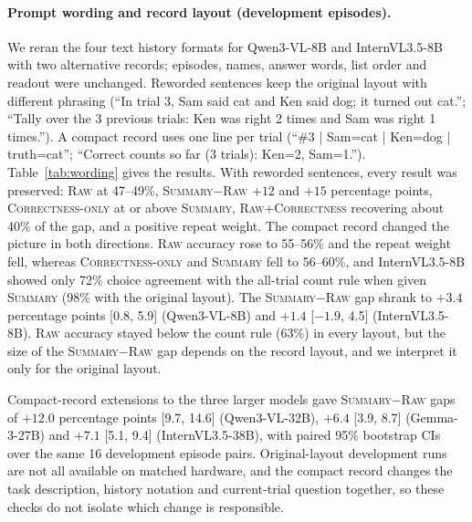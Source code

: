 \documentclass[letterpaper]{article} %
\newcommand{\Raw}{\textsc{Raw}}
\newcommand{\RawCorrectness}{\textsc{Raw+Correctness}}
\newcommand{\CorrectnessOnly}{\textsc{Correctness-only}}
\newcommand{\Summary}{\textsc{Summary}}
\begin{document}
\paragraph{Prompt wording and record layout (development episodes).} We reran the four text history formats for Qwen3-VL-8B and InternVL3.5-8B with two alternative records; episodes, names, answer words, list order and readout were unchanged. Reworded sentences keep the original layout with different phrasing (``In trial 3, Sam said cat and Ken said dog; it turned out cat.''; ``Tally over the 3 previous trials: Ken was right 2 times and Sam was right 1 times.''). A compact record uses one line per trial (``\#3 | Sam=cat | Ken=dog | truth=cat''; ``Correct counts so far (3 trials): Ken=2, Sam=1.''). Table~\ref{tab:wording} gives the results. With reworded sentences, every result was preserved: \Raw{} at 47--49\%, \Summary{}$-$\Raw{} $+12$ and $+15$ percentage points, \CorrectnessOnly{} at or above \Summary{}, \RawCorrectness{} recovering about 40\% of the gap, and a positive repeat weight. The compact record changed the picture in both directions. \Raw{} accuracy rose to 55--56\% and the repeat weight fell, whereas \CorrectnessOnly{} and \Summary{} fell to 56--60\%, and InternVL3.5-8B showed only 72\% choice agreement with the all-trial count rule when given \Summary{} (98\% with the original layout). The \Summary{}$-$\Raw{} gap shrank to $+3.4$ percentage points [0.8, 5.9] (Qwen3-VL-8B) and $+1.4$ [$-1.9$, 4.5] (InternVL3.5-8B). \Raw{} accuracy stayed below the count rule (63\%) in every layout, but the size of the \Summary{}$-$\Raw{} gap depends on the record layout, and we interpret it only for the original layout.

Compact-record extensions to the three larger models gave \Summary{}$-$\Raw{} gaps of $+12.0$ percentage points [9.7, 14.6] (Qwen3-VL-32B), $+6.4$ [3.9, 8.7] (Gemma-3-27B) and $+7.1$ [5.1, 9.4] (InternVL3.5-38B), with paired 95\% bootstrap CIs over the same 16 development episode pairs. Original-layout development runs are not all available on matched hardware, and the compact record changes the task description, history notation and current-trial question together, so these checks do not isolate which change is responsible.
\end{document}

